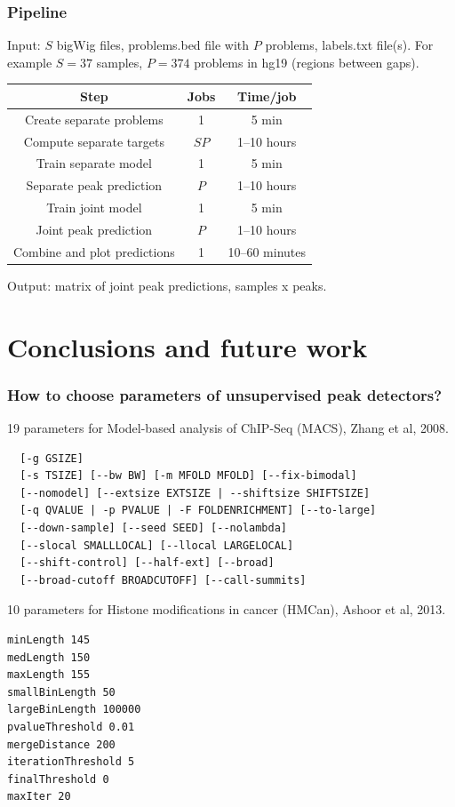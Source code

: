 \documentclass{beamer}
\begin{document}
\begin{frame}
  \frametitle{Pipeline}
Input: $S$ bigWig files, problems.bed file with $P$ problems, labels.txt file(s).
For example $S=37$ samples, $P=374$ problems in hg19 (regions between gaps).
  \begin{tabular}{ccc}
    Step& Jobs& Time/job \\
    \hline
    Create separate problems & 1 & 5 min\\
    Compute separate targets & $S P$ & 1--10 hours\\
    Train separate model & 1 & 5 min \\
    Separate peak prediction & $P$ & 1--10 hours\\
    Train joint model & 1 & 5 min \\
    Joint peak prediction & $P$ & 1--10 hours\\
    Combine and plot predictions & 1 & 10--60 minutes
  \end{tabular}
Output: matrix of joint peak predictions, samples x peaks.
\end{frame}

\section{Conclusions and future work}

\begin{frame}[fragile]
  \frametitle{How to choose parameters of unsupervised peak
    detectors?}
\scriptsize
19 parameters for Model-based analysis of ChIP-Seq (MACS), Zhang et al, 2008.
\begin{verbatim}
  [-g GSIZE]
  [-s TSIZE] [--bw BW] [-m MFOLD MFOLD] [--fix-bimodal]
  [--nomodel] [--extsize EXTSIZE | --shiftsize SHIFTSIZE]
  [-q QVALUE | -p PVALUE | -F FOLDENRICHMENT] [--to-large]
  [--down-sample] [--seed SEED] [--nolambda]
  [--slocal SMALLLOCAL] [--llocal LARGELOCAL]
  [--shift-control] [--half-ext] [--broad]
  [--broad-cutoff BROADCUTOFF] [--call-summits]
\end{verbatim}
10 parameters for Histone modifications in cancer (HMCan),
Ashoor et al, 2013.
\begin{verbatim}
minLength 145
medLength 150
maxLength 155
smallBinLength 50
largeBinLength 100000
pvalueThreshold 0.01
mergeDistance 200
iterationThreshold 5
finalThreshold 0
maxIter 20
\end{verbatim}
\end{frame}
\end{document}
